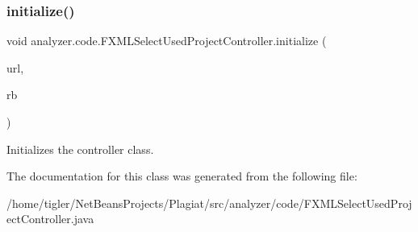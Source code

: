 \subsubsection{\texorpdfstring{initialize()}{initialize()}}
{\footnotesize\ttfamily void analyzer.\+code.\+F\+X\+M\+L\+Select\+Used\+Project\+Controller.\+initialize (\begin{DoxyParamCaption}\item[{U\+RL}]{url,  }\item[{Resource\+Bundle}]{rb }\end{DoxyParamCaption})\hspace{0.3cm}{\ttfamily [inline]}}

Initializes the controller class. 

The documentation for this class was generated from the following file\+:\begin{DoxyCompactItemize}
\item 
/home/tigler/\+Net\+Beans\+Projects/\+Plagiat/src/analyzer/code/F\+X\+M\+L\+Select\+Used\+Project\+Controller.\+java\end{DoxyCompactItemize}
